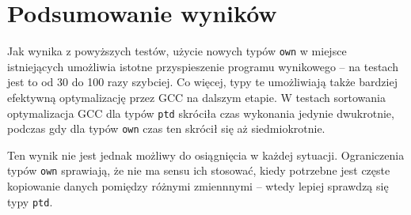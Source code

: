 \documentclass[licencjacka]{pracamgr}
\begin{document}
\section{Podsumowanie wyników}
Jak wynika z powyższych testów, użycie nowych typów \texttt{own} w miejsce istniejących umożliwia istotne przyspieszenie
programu wynikowego -- na testach jest to od 30 do 100 razy szybciej.
Co więcej, typy te umożliwiają także bardziej efektywną optymalizację przez GCC na dalszym etapie.
W testach sortowania optymalizacja GCC dla typów \texttt{ptd} skróciła czas wykonania jedynie dwukrotnie, podczas
gdy dla typów \texttt{own} czas ten skrócił się aż siedmiokrotnie.

Ten wynik nie jest jednak możliwy do osiągnięcia w każdej sytuacji.
Ograniczenia typów \texttt{own} sprawiają, że nie ma sensu ich stosować, kiedy potrzebne jest częste kopiowanie danych
pomiędzy różnymi zmiennnymi -- wtedy lepiej sprawdzą się typy \texttt{ptd}.
\end{document}
